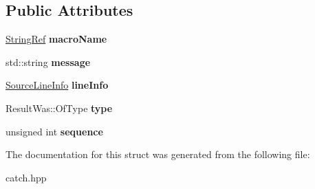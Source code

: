 \subsection*{Public Attributes}
\begin{DoxyCompactItemize}
\item 
\mbox{\label{structCatch_1_1MessageInfo_a3ee7cd41def0989d2193bad7101436a0}} 
\hyperlink{classCatch_1_1StringRef}{String\+Ref} {\bfseries macro\+Name}
\item 
\mbox{\label{structCatch_1_1MessageInfo_ab6cd06e050bf426c6577502a5c50e256}} 
std\+::string {\bfseries message}
\item 
\mbox{\label{structCatch_1_1MessageInfo_a985165328723e599696ebd8e43195cc5}} 
\hyperlink{structCatch_1_1SourceLineInfo}{Source\+Line\+Info} {\bfseries line\+Info}
\item 
\mbox{\label{structCatch_1_1MessageInfo_ae928b9117465c696e45951d9d0284e78}} 
Result\+Was\+::\+Of\+Type {\bfseries type}
\item 
\mbox{\label{structCatch_1_1MessageInfo_a7f4f57ea21e50160adefce7b68a781d6}} 
unsigned int {\bfseries sequence}
\end{DoxyCompactItemize}


The documentation for this struct was generated from the following file\+:\begin{DoxyCompactItemize}
\item 
catch.\+hpp\end{DoxyCompactItemize}
